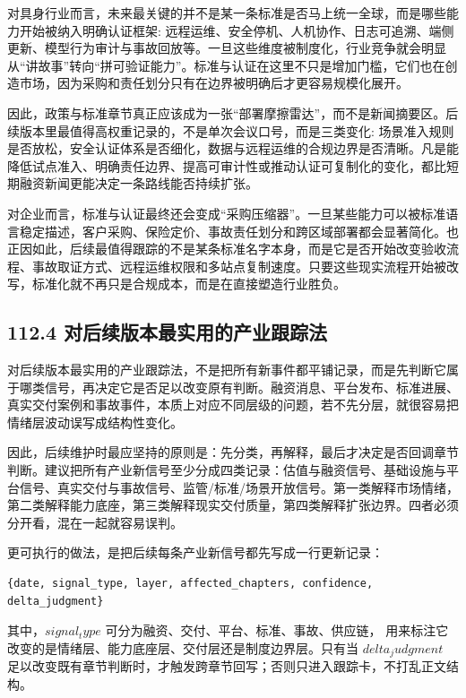 对具身行业而言，未来最关键的并不是某一条标准是否马上统一全球，而是哪些能力开始被纳入明确认证框架: 远程运维、安全停机、人机协作、日志可追溯、端侧更新、模型行为审计与事故回放等。一旦这些维度被制度化，行业竞争就会明显从“讲故事”转向“拼可验证能力”。标准与认证在这里不只是增加门槛，它们也在创造市场，因为采购和责任划分只有在边界被明确后才更容易规模化展开。

因此，政策与标准章节真正应该成为一张“部署摩擦雷达”，而不是新闻摘要区。后续版本里最值得高权重记录的，不是单次会议口号，而是三类变化: 场景准入规则是否放松，安全认证体系是否细化，数据与远程运维的合规边界是否清晰。凡是能降低试点准入、明确责任边界、提高可审计性或推动认证可复制化的变化，都比短期融资新闻更能决定一条路线能否持续扩张。

对企业而言，标准与认证最终还会变成“采购压缩器”。一旦某些能力可以被标准语言稳定描述，客户采购、保险定价、事故责任划分和跨区域部署都会显著简化。也正因如此，后续最值得跟踪的不是某条标准名字本身，而是它是否开始改变验收流程、事故取证方式、远程运维权限和多站点复制速度。只要这些现实流程开始被改写，标准化就不再只是合规成本，而是在直接塑造行业胜负。

\subsection*{112.4 对后续版本最实用的产业跟踪法}


对后续版本最实用的产业跟踪法，不是把所有新事件都平铺记录，而是先判断它属于哪类信号，再决定它是否足以改变原有判断。融资消息、平台发布、标准进展、真实交付案例和事故事件，本质上对应不同层级的问题，若不先分层，就很容易把情绪层波动误写成结构性变化。

因此，后续维护时最应坚持的原则是：先分类，再解释，最后才决定是否回调章节判断。建议把所有产业新信号至少分成四类记录：估值与融资信号、基础设施与平台信号、真实交付与事故信号、监管/标准/场景开放信号。第一类解释市场情绪，第二类解释能力底座，第三类解释现实交付质量，第四类解释扩张边界。四者必须分开看，混在一起就容易误判。

更可执行的做法，是把后续每条产业新信号都先写成一行更新记录：

\begin{lstlisting}
{date, signal_type, layer, affected_chapters, confidence, delta_judgment}
\end{lstlisting}

其中，\(signal_type\) 可分为融资、交付、平台、标准、事故、供应链，\texttt{} 用来标注它改变的是情绪层、能力底座层、交付层还是制度边界层。只有当 \(delta_judgment\) 足以改变既有章节判断时，才触发跨章节回写；否则只进入跟踪卡，不打乱正文结构。

